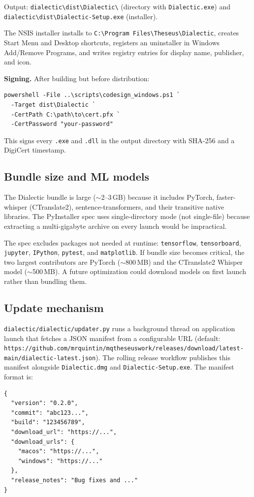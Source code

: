 \documentclass[11pt,letterpaper]{article}
\newcommand{\file}[1]{\texttt{#1}}
\newcommand{\cmd}[1]{\texttt{#1}}
\begin{document}
Output: \file{dialectic\textbackslash dist\textbackslash Dialectic\textbackslash} (directory with \file{Dialectic.exe}) and \file{dialectic\textbackslash dist\textbackslash Dialectic-Setup.exe} (installer).

The NSIS installer installs to \file{C:\textbackslash Program Files\textbackslash Theseus\textbackslash Dialectic}, creates Start Menu and Desktop shortcuts, registers an uninstaller in Windows Add/Remove Programs, and writes registry entries for display name, publisher, and icon.

\textbf{Signing.} After building but before distribution:
\begin{lstlisting}
powershell -File ..\scripts\codesign_windows.ps1 `
  -Target dist\Dialectic `
  -CertPath C:\path\to\cert.pfx `
  -CertPassword "your-password"
\end{lstlisting}

This signs every \file{.exe} and \file{.dll} in the output directory with SHA-256 and a DigiCert timestamp.

\subsection{Bundle size and ML models}

The Dialectic bundle is large (${\sim}$2--3\,GB) because it includes PyTorch, faster-whisper (CTranslate2), sentence-transformers, and their transitive native libraries. The PyInstaller spec uses single-directory mode (not single-file) because extracting a multi-gigabyte archive on every launch would be impractical.

The spec excludes packages not needed at runtime: \cmd{tensorflow}, \cmd{tensorboard}, \cmd{jupyter}, \cmd{IPython}, \cmd{pytest}, and \cmd{matplotlib}. If bundle size becomes critical, the two largest contributors are PyTorch (${\sim}$800\,MB) and the CTranslate2 Whisper model (${\sim}$500\,MB). A future optimization could download models on first launch rather than bundling them.

\subsection{Update mechanism}

\file{dialectic/dialectic/updater.py} runs a background thread on application launch that fetches a JSON manifest from a configurable URL (default: \cmd{https://github.com/mrquintin/mqtheseuswork/releases/download/latest-main/dialectic-latest.json}). The rolling release workflow publishes this manifest alongside \file{Dialectic.dmg} and \file{Dialectic-Setup.exe}. The manifest format is:
\begin{lstlisting}
{
  "version": "0.2.0",
  "commit": "abc123...",
  "build": "123456789",
  "download_url": "https://...",
  "download_urls": {
    "macos": "https://...",
    "windows": "https://..."
  },
  "release_notes": "Bug fixes and ..."
}
\end{lstlisting}
\end{document}

